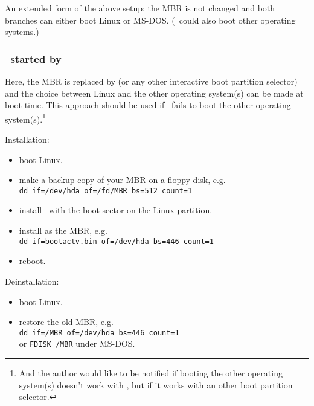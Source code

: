 An extended form of the above setup: the MBR is not changed and both branches
can either boot Linux or MS-DOS. (\LILO\ could also boot other
operating systems.)


\subsubsection{\LILO\ started by \protect\footnotemark}


Here, the MBR is replaced by  (or any other interactive boot
partition selector) and the choice between Linux and the
other operating system(s) can be made at boot time. This approach should be
used if \LILO\ fails to boot the other operating system(s).\footnote{%
And the author would like to be notified if booting the other operating
system(s) doesn't work with \LILO, but if it works with an other boot partition
selector.}

Installation:
\begin{itemize}
  \item boot Linux.
  \item make a backup copy of your MBR on a floppy disk, e.g. \\
    \verb"dd if=/dev/hda of=/fd/MBR bs=512 count=1"
  \item install \LILO\ with the boot sector on the Linux partition.
  \item install  as the MBR, e.g. \\
    \verb"dd if=bootactv.bin of=/dev/hda bs=446 count=1"
  \item reboot.
\end{itemize}

Deinstallation:
\begin{itemize}
  \item boot Linux.
  \item restore the old MBR, e.g. \\
    \verb"dd if=/MBR of=/dev/hda bs=446 count=1" \\
    or \verb"FDISK /MBR" under MS-DOS.
\end{itemize}

